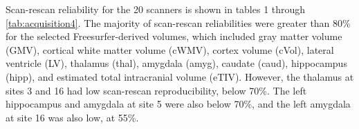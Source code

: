 Scan-rescan reliability for the 20 scanners is shown in tables 1 through \ref{tab:acquisition4}. The majority of scan-rescan reliabilities were greater than 80\% for the selected Freesurfer-derived volumes, which included gray matter volume (GMV), cortical white matter volume (cWMV), cortex volume (cVol), lateral ventricle (LV), thalamus (thal), amygdala (amyg), caudate (caud), hippocampus (hipp), and estimated total intracranial volume (eTIV). However, the thalamus at sites 3 and 16 had low scan-rescan reproducibility, below 70\%. The left hippocampus and amygdala at site 5 were also below 70\%, and the left amygdala at site 16 was also low, at 55\%. 

